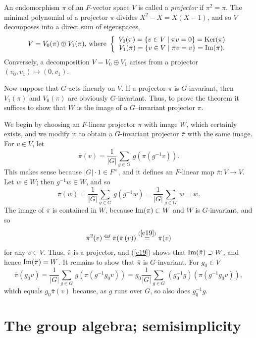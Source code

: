 \documentclass[a4paper,11pt,final]{memoir}%
\theoremstyle{nonumberplain}
\begin{document}
An endomorphism $\pi$ of an $F$-vector space $V$ is called a%
\emph{projector} if $\pi^{2}=\pi$. The minimal polynomial of a projector $\pi$
divides $X^{2}-X=X(X-1)$, and so $V$ decomposes into a direct sum of
eigenspaces,%
\[
V=V_{0}(\pi)\oplus V_{1}(\pi)\text{, where }\left\{
\begin{array}
[c]{c}%
V_{0}(\pi)=\{v\in V\mid\pi v=0\}=\Ker(\pi)\\
V_{1}(\pi)=\{v\in V\mid\pi v=v\}=\im(\pi).
\end{array}
\right.
\]
Conversely, a decomposition $V=V_{0}\oplus V_{1}$ arises from a projector
$(v_{0},v_{1})\mapsto(0,v_{1})$.

Now suppose that $G$ acts linearly on $V$. If a projector $\pi$ is
$G$-invariant, then $V_{1}(\pi)$ and $V_{0}(\pi)$ are obviously $G$-invariant.
Thus, to prove the theorem it suffices to show that $W$ is the image of a
$G$--invariant projector $\pi$.

We begin by choosing an $F$-linear projector $\pi$ with image $W$, which
certainly exists, and we modify it to obtain a $G$-invariant projector
$\bar{\pi}$ with the same image. For $v\in V$, let%
\[
\bar{\pi}(v)=\frac{1}{|G|}\sum_{g\in G}\,g\left(  \pi(g^{-1}v)\right)  .
\]
This makes sense because $|G|\cdot1\in F^{\times}$, and it defines an
$F$-linear map $\bar{\pi}\colon V\rightarrow V$. Let $w\in W$; then
$g^{-1}w\in W$, and so%
\begin{equation}
\bar{\pi}(w)=\frac{1}{|G|}\sum_{g\in G}\,g(g^{-1}w)=\frac{1}{|G|}\sum_{g\in
G}\,w=w. \label{e19}%
\end{equation}
The image of $\bar{\pi}$ is contained in $W$, because $\operatorname{Im}(\pi)\subset W$ and
$W$ is $G$-invariant, and so
\[
\bar{\pi}^{2}(v)\overset{\df}{=}\bar{\pi}(\bar{\pi}\left(
v)\right)  \overset{(\ref{e19})}{=}\bar{\pi}(v)
\]
for any $v\in V$. Thus, $\bar{\pi}$ is a projector, and (\ref{e19}) shows that
$\operatorname{Im}(\bar{\pi})\supset W$, and hence $\operatorname{Im}(\bar{\pi})=W$. It remains to show
that $\bar{\pi}$ is $G$-invariant. For $g_{0}\in V$
\[
\bar{\pi}(g_{0}v)=\frac{1}{|G|}\sum_{g\in G}\,g\left(  \pi(g^{-1}%
g_{0}v)\right)  =g_{0}\frac{1}{|G|}\sum_{g\in G}\,(g_{0}^{-1}g)\left(
\pi(g^{-1}g_{0}v)\right)  ,
\]
which equals $g_{0}\bar{\pi}\left(  v\right)  $ because, as $g$ runs over $G$,
so also does $g_{0}^{-1}g$.

\section{The group algebra; semisimplicity}
\end{document}
